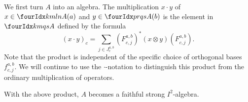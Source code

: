 



We first turn $A$ into an algebra. The multiplication $x\cdot y$ of $x\in \Gr{A}{k}{l}{m}{n}(a)$ and $y\in \Gr{A}{p}{q}{r}{s}(b)$ is the element in $\Gr{A}{k}{q}{m}{s}$ defined by the formula \[(x\cdot y)_c = \sum_{j\in J^{a,b}_c} \left(F^{a,b}_{c,j}\right)^*(x\otimes y)\left( F^{a,b}_{c,j}\right).\] Note that the product is independent of the specific choice of orthogonal bases $f^{a,b}_{c,j}$. We will continue to use the $\cdot$-notation to distinguish this product from the ordinary multiplication of operators.

\begin{Lem} With the above product, $A$ becomes a faithful strong $I^2$-algebra.
\end{Lem}

